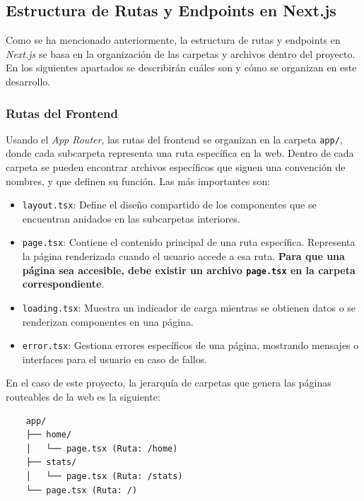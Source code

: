 \subsection{Estructura de Rutas y Endpoints en Next.js}

Como se ha mencionado anteriormente, la estructura de rutas y endpoints en \textit{Next.js} se basa en la organización de las carpetas y archivos dentro del proyecto. En los siguientes apartados se describirán cuáles son y cómo se organizan en este desarrollo.

\subsubsection{Rutas del Frontend}

Usando el \textit{App Router}, las rutas del frontend se organizan en la carpeta \texttt{app/}, donde cada subcarpeta representa una ruta específica en la web. Dentro de cada carpeta se pueden encontrar archivos específicos que siguen una convención de nombres, y que definen su función. Las más importantes son:

\begin{itemize}
    \item \texttt{layout.tsx}: Define el diseño compartido de los componentes que se encuentran anidados en las subcarpetas interiores.
    \item \texttt{page.tsx}: Contiene el contenido principal de una ruta específica. Representa la página renderizada cuando el usuario accede a esa ruta. \textbf{Para que una página sea accesible, debe existir un archivo \texttt{page.tsx} en la carpeta correspondiente}.
    \item \texttt{loading.tsx}: Muestra un indicador de carga mientras se obtienen datos o se renderizan componentes en una página.
    \item \texttt{error.tsx}: Gestiona errores específicos de una página, mostrando mensajes o interfaces para el usuario en caso de fallos.
\end{itemize}

En el caso de este proyecto, la jerarquía de carpetas que genera las páginas routeables de la web es la siguiente:

\begin{verbatim}
    app/
    ├── home/
    │   └── page.tsx (Ruta: /home)
    ├── stats/
    │   └── page.tsx (Ruta: /stats)
    └── page.tsx (Ruta: /)
\end{verbatim}

